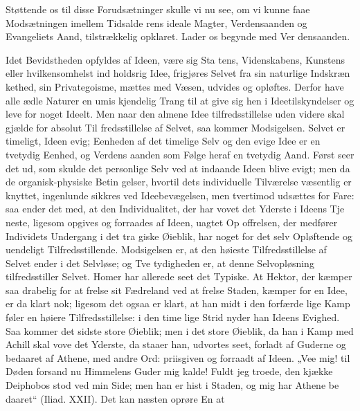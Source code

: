 \documentclass[12pt]{book}
\newcommand{\opage}[1]{\marginnote{\footnotesize\textit{[#1]}}}
\begin{document}
Støttende os til disse Forudsætninger skulle vi nu
see, om vi kunne faae Modsætningen imellem Tidsalde\-%
rens ideale Magter, Verdensaanden og Evangeliets Aand,
tilstrækkelig opklaret. Lader os begynde med Ver\-%
densaanden.

Idet Bevidstheden opfyldes af Ideen, være sig Sta\-%
tens, Videnskabens, Kunstens eller hvilkensomhelst ind\-%
holdsrig Idee, frigjøres Selvet fra sin naturlige Indskræn\-%
kethed, sin Privategoisme, mættes med Væsen, udvides
og opløftes. Derfor have alle ædle Naturer en umis\-%
kjendelig Trang til at give sig hen i Ideetilskyndelser
og leve for noget Ideelt. Men naar den almene Idee\-%
tilfredsstillelse uden videre skal gjælde for absolut Til\-%
fredsstillelse af Selvet, saa kommer Modsigelsen. Selvet
er timeligt, Ideen evig; Eenheden af det timelige Selv
og den evige Idee er en tvetydig Eenhed, og Verdens\-%
aanden som Følge heraf en tvetydig Aand. Først seer
det ud, som skulde det personlige Selv ved at indaande
Ideen blive evigt; men da de organisk-physiske Betin\-%
gelser, hvortil dets individuelle Tilværelse væsentlig er
knyttet, ingenlunde sikkres ved Ideebevægelsen, men
tvertimod udsættes for Fare: saa ender det med, at den
Individualitet, der har vovet det Yderste i Ideens Tje\-%
neste, ligesom opgives og forraades af Ideen, uagtet Op\-%
offrelsen, der medfører Individets Undergang i det tra\-%
giske Øieblik, har noget for det selv Opløftende og
uendeligt Tilfredsstillende. Modsigelsen er, at den høieste
Tilfredsstillelse af Selvet ender i det Selvløse; og Tve\-%
tydigheden er, at denne Selvopløsning tilfredsstiller Selvet.
Homer har allerede seet det Typiske. At Hektor, der
kæmper saa drabelig for at frelse sit Fædreland ved at
frelse Staden, kæmper for en Idee, er da klart nok;
\opage{42}\setcounter{footnote}{0}%
ligesom det ogsaa er klart, at han midt i den forfærde\-%
lige Kamp føler en høiere Tilfredsstillelse: i den time\-%
lige Strid nyder han Ideens Evighed. Saa kommer det
sidste store Øieblik; men i det store Øieblik, da han i
Kamp med Achill skal vove det Yderste, da staaer han,
udvortes seet, forladt af Guderne og bedaaret af Athene,
med andre Ord: priisgiven og forraadt af Ideen. „Vee
mig! til Døden forsand nu Himmelens Guder mig kalde!
Fuldt jeg troede, den kjække Deiphobos stod ved min
Side; men han er hist i Staden, og mig har Athene be\-%
daaret“ (Iliad. XXII). Det kan næsten oprøre En at
\end{document}

